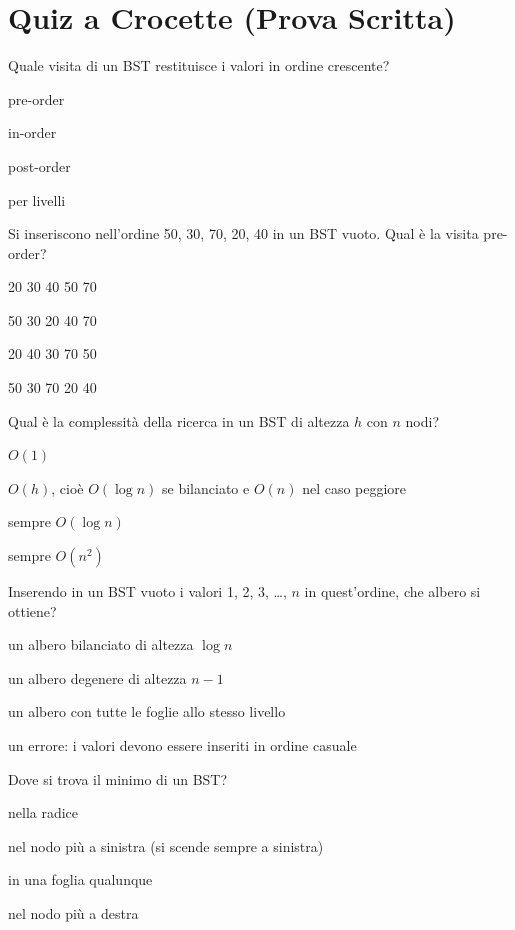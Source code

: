 \section{Quiz a Crocette (Prova Scritta)}

\begin{quiz}{Quale visita di un BST restituisce i valori in ordine crescente?}
  \item pre-order
  \item in-order
  \item post-order
  \item per livelli
\end{quiz}

\begin{quiz}{Si inseriscono nell'ordine 50, 30, 70, 20, 40 in un BST vuoto. Qual è la visita pre-order?}
  \item 20 30 40 50 70
  \item 50 30 20 40 70
  \item 20 40 30 70 50
  \item 50 30 70 20 40
\end{quiz}

\begin{quiz}{Qual è la complessità della ricerca in un BST di altezza $h$ con $n$ nodi?}
  \item $O(1)$
  \item $O(h)$, cioè $O(\log n)$ se bilanciato e $O(n)$ nel caso peggiore
  \item sempre $O(\log n)$
  \item sempre $O(n^2)$
\end{quiz}

\begin{quiz}{Inserendo in un BST vuoto i valori 1, 2, 3, \ldots, $n$ in quest'ordine, che albero si ottiene?}
  \item un albero bilanciato di altezza $\log n$
  \item un albero degenere di altezza $n - 1$
  \item un albero con tutte le foglie allo stesso livello
  \item un errore: i valori devono essere inseriti in ordine casuale
\end{quiz}

\begin{quiz}{Dove si trova il minimo di un BST?}
  \item nella radice
  \item nel nodo più a sinistra (si scende sempre a sinistra)
  \item in una foglia qualunque
  \item nel nodo più a destra
\end{quiz}

